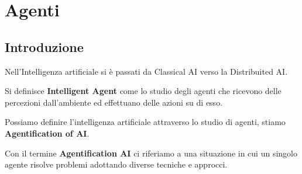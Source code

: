 \chapter{Agenti}
\section{Introduzione}
Nell'Intelligenza artificiale si è passati da Classical AI verso la Distribuited
AI.
\begin{definizione}
    Si definisce \textbf{Intelligent Agent} come lo studio degli agenti che
    ricevono delle percezioni dall'ambiente ed effettuano delle azioni su di esso.
\end{definizione}
Possiamo definire l'intelligenza artificiale attraverso lo studio di agenti,
stiamo \textbf{Agentification of AI}.
\begin{definizione}
    Con il termine \textbf{Agentification AI} ci riferiamo a una situazione in
    cui un singolo agente risolve problemi adottando diverse tecniche e approcci.
\end{definizione}
